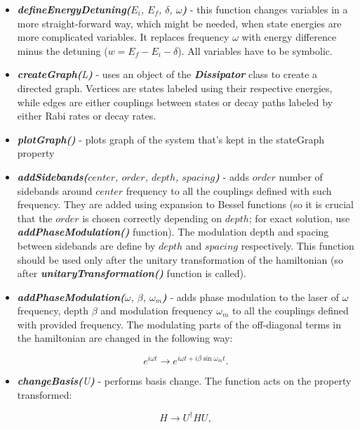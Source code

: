 \documentclass{article}
\numberwithin{equation}{section}
\numberwithin{figure}{section}
\numberwithin{table}{section}
\newcommand\codefun[2]{\textit{\textbf{#1(}#2\textbf{)}}}
\newcommand\codevar[1]{\ttfamily #1\rmfamily}
\newcommand\codeclass[1]{\ttfamily\textbf{\textit{#1}}\rmfamily}
\begin{document}
\begin{itemize}
\item \codefun{defineEnergyDetuning}{$E_i$, $E_f$, $\delta$, $\omega$} - this function changes variables in a more straight-forward way, which might be needed, when state energies are more complicated variables. It replaces frequency $\omega$ with energy difference minus the detuning ($w=E_f-E_i-\delta$). All variables have to be symbolic.

\item \codefun{createGraph}{L} - uses an object of the \codeclass{Dissipator} class to create a directed graph. Vertices are states labeled using their respective energies, while edges are either couplings between states or decay paths labeled by either Rabi rates or decay rates.

\item \codefun{plotGraph}{} - plots graph of the system that's kept in the \codevar{stateGraph} property

\item \codefun{addSidebands}{$center$, $order$, $depth$, $spacing$} - adds $order$ number of sidebands around $center$ frequency to all the couplings defined with such frequency. They are added using expansion to Bessel functions (so it is crucial that the $order$ is chosen correctly depending on $depth$; for exact solution, use \codefun{addPhaseModulation}{} function). The modulation depth and spacing between sidebands are define by $depth$ and $spacing$ respectively. This function should be used only after the unitary transformation of the hamiltonian (so after \codefun{unitaryTransformation}{} function is called).

\item \codefun{addPhaseModulation}{$\omega$, $\beta$, $\omega_m$} - adds phase modulation to the laser of $\omega$ frequency, depth $\beta$ and modulation frequency $\omega_m$ to all the couplings defined with provided frequency. The modulating parts of the off-diagonal terms in the hamiltonian are changed in the following way:

\begin{displaymath}
e^{i\omega t}\rightarrow e^{i\omega t + i\beta\sin{\omega_m t}}.
\end{displaymath}


\item \codefun{changeBasis}{U} - performs basis change. The function acts on the property \codevar{transformed}:

\begin{displaymath}
H\rightarrow U^{\dagger}HU,
\end{displaymath}


\end{itemize}
\end{document}
